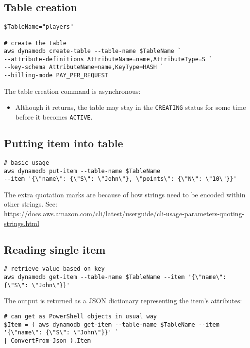 \documentclass[slides]{pgnotes}
\begin{document}
\subsection{Table creation}\label{sec:table-creation}

\begin{verbatim}
$TableName="players"

# create the table
aws dynamodb create-table --table-name $TableName `
--attribute-definitions AttributeName=name,AttributeType=S `
--key-schema AttributeName=name,KeyType=HASH `
--billing-mode PAY_PER_REQUEST
\end{verbatim}

The table creation command is asynchronous:
\begin{itemize}
\item Although it returns, the table may stay in the \texttt{CREATING} status for some time before it becomes \texttt{ACTIVE}.
\end{itemize}

\subsection{Putting item into table}\label{sec:putting-item-into-table}

\begin{verbatim}
# basic usage
aws dynamodb put-item --table-name $TableName
--item '{\"name\": {\"S\": \"John\"}, \"points\": {\"N\": \"10\"}}'
\end{verbatim}

The extra quotation marks are because of how strings need to be encoded
within other strings. See:\\
\url{https://docs.aws.amazon.com/cli/latest/userguide/cli-usage-parameters-quoting-strings.html}

\subsection{Reading single item}\label{sec:reading-single-item}

\begin{verbatim}
# retrieve value based on key
aws dynamodb get-item --table-name $TableName --item '{\"name\": {\"S\": \"John\"}}'
\end{verbatim}

The output is returned as a JSON dictionary representing the item's attributes:

\begin{verbatim}
# can get as PowerShell objects in usual way
$Item = ( aws dynamodb get-item --table-name $TableName --item '{\"name\": {\"S\": \"John\"}}' `
| ConvertFrom-Json ).Item
\end{verbatim}
\end{document}
